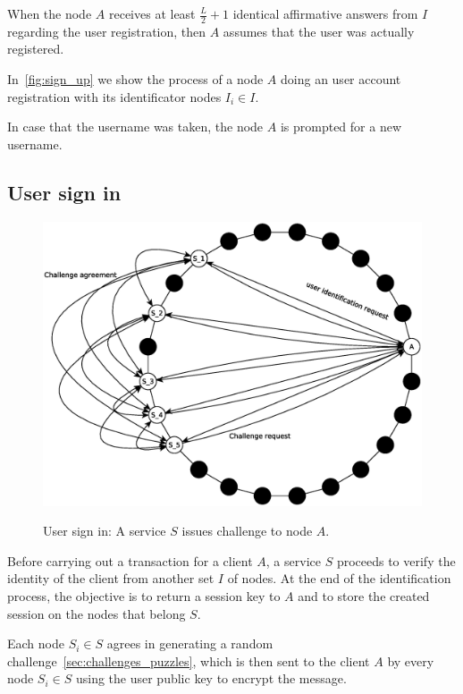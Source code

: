 When the node
$A$ receives at least $\frac{L}{2} + 1$ identical affirmative answers from
$I$ regarding the user registration, then $A$ assumes that the user was
actually registered.

In~\ref{fig:sign_up} we show the process of a node $A$ doing an user account
registration with its identificator nodes $I_i \in I$.

In case that the username was taken,
the node $A$ is prompted for a new username.



\subsection{User sign in}
\begin{figure}[!htb]
\centering
\includegraphics[width=14cm]{../img/sign_in}\\
\caption{User sign in: A service $S$ issues challenge to node $A$.}
\label{fig:sign_in}
\end{figure}

Before carrying out a transaction for a client $A$, a service $S$ proceeds to
verify the identity of the client from another set $I$ of nodes. At the end of
the identification process, the objective is to return a session key to $A$
and to store the created session on the nodes that belong $S$.

Each node $S_i \in S$ agrees in generating a random challenge~\ref{sec:challenges_puzzles}, which is then sent to the
client $A$ by every node $S_i \in S$ using the user public key to encrypt the
message.

